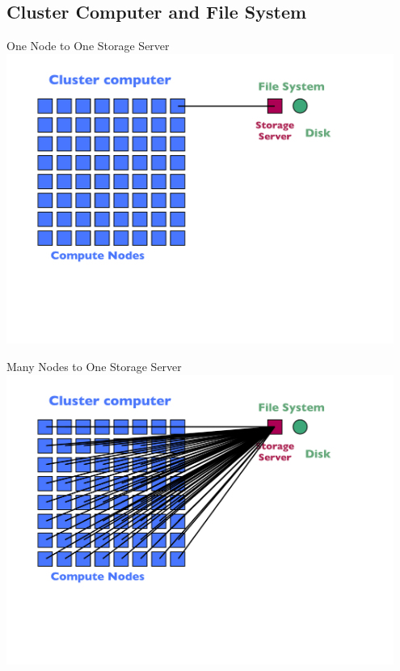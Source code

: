 \subsection{Cluster Computer and File System}
\makesubcontentsslidessec

\begin{frame}{One Node to One Storage Server}
    \centering
    \includegraphics[width=0.95\textwidth]{../common/pics/hardware/ParallelHardware15.pdf}
\end{frame}

\begin{frame}{Many Nodes to One Storage Server}
    \centering
    \includegraphics[width=0.95\textwidth]{../common/pics/hardware/ParallelHardware16.pdf}
\end{frame}

